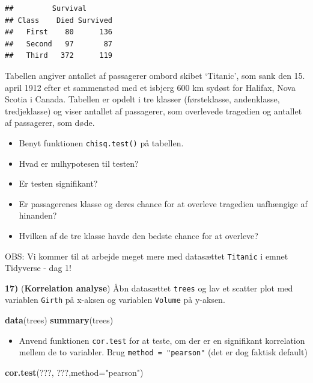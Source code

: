 \documentclass[
]{book}
\newenvironment{Shaded}{\begin{snugshade}}{\end{snugshade}}
\newcommand{\AttributeTok}[1]{\textcolor[rgb]{0.13,0.29,0.53}{#1}}
\newcommand{\FunctionTok}[1]{\textcolor[rgb]{0.13,0.29,0.53}{\textbf{#1}}}
\newcommand{\NormalTok}[1]{#1}
\newcommand{\StringTok}[1]{\textcolor[rgb]{0.31,0.60,0.02}{#1}}
\providecommand{\tightlist}{%
  \setlength{\itemsep}{0pt}\setlength{\parskip}{0pt}}
\begin{document}
\begin{verbatim}
##         Survival
## Class    Died Survived
##   First    80      136
##   Second   97       87
##   Third   372      119
\end{verbatim}

Tabellen angiver antallet af passagerer ombord skibet `Titanic', som sank den 15. april 1912 efter et sammenstød med et isbjerg 600 km sydøst for Halifax, Nova Scotia i Canada. Tabellen er opdelt i tre klasser (førsteklasse, andenklasse, tredjeklasse) og viser antallet af passagerer, som overlevede tragedien og antallet af passagerer, som døde.

\begin{itemize}
\item
  Benyt funktionen \texttt{chisq.test()} på tabellen.
\item
  Hvad er nulhypotesen til testen?
\item
  Er testen signifikant?
\item
  Er passagerenes klasse og deres chance for at overleve tragedien uafhængige af hinanden?
\item
  Hvilken af de tre klasse havde den bedste chance for at overleve?
\end{itemize}

OBS: Vi kommer til at arbejde meget mere med datasættet \texttt{Titanic} i emnet Tidyverse - dag 1!

\textbf{17)} (\textbf{Korrelation analyse}) Åbn datasættet \texttt{trees} og lav et scatter plot med variablen \texttt{Girth} på x-aksen og variablen \texttt{Volume} på y-aksen.

\begin{Shaded}
\begin{Highlighting}[]
\FunctionTok{data}\NormalTok{(trees)}
\FunctionTok{summary}\NormalTok{(trees)}
\end{Highlighting}
\end{Shaded}

\begin{itemize}
\tightlist
\item
  Anvend funktionen \texttt{cor.test} for at teste, om der er en signifikant korrelation mellem de to variabler. Brug \texttt{method\ =\ "pearson"} (det er dog faktisk default)
\end{itemize}

\begin{Shaded}
\begin{Highlighting}[]
\FunctionTok{cor.test}\NormalTok{(???, ???,}\AttributeTok{method=}\StringTok{"pearson"}\NormalTok{)}
\end{Highlighting}
\end{Shaded}
\end{document}
